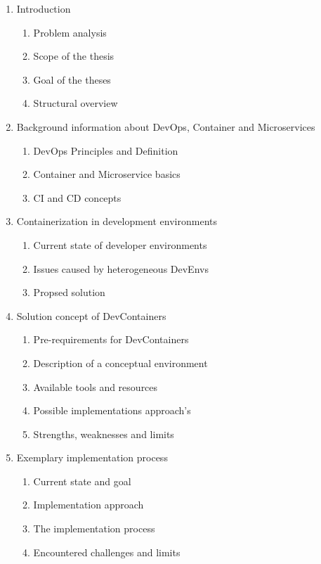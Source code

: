\documentclass[12pt, a4paper]{article}
\begin{document}
\begin{enumerate}
    \item Introduction
    \begin{enumerate}
        \item Problem analysis
        \item Scope of the thesis
        \item Goal of the theses
        \item Structural overview
    \end{enumerate}
    \item Background information about DevOps, Container and Microservices
    \begin{enumerate}
        \item DevOps Principles and Definition
        \item Container and Microservice basics
        \item \acl{CI} and \acl{CD} concepts
    \end{enumerate}
    \item Containerization in development environments
    \begin{enumerate}
        \item Current state of developer environments
        \item Issues caused by heterogeneous DevEnvs
        \item Propsed solution
    \end{enumerate}
    \item Solution concept of DevContainers
    \begin{enumerate}
        \item Pre-requirements for DevContainers
        \item Description of a conceptual environment
        \item Available tools and resources
        \item Possible implementations approach's
        \item Strengths, weaknesses and limits
    \end{enumerate}
    \item Exemplary implementation process
    \begin{enumerate}
        \item Current state and goal
        \item Implementation approach
        \item The implementation process
        \item Encountered challenges and limits

\end{enumerate}
\end{enumerate}
\end{document}
